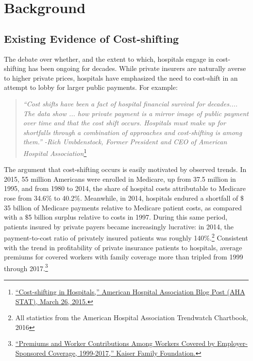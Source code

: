\documentclass[12pt]{article}
\begin{document}
\section{Background}
\label{sec:Background}

\subsection{Existing Evidence of Cost-shifting}
The debate over whether, and the extent to which, hospitals engage in cost-shifting has been ongoing for decades. While private insurers are naturally averse to higher private prices, hospitals have emphasized the need to cost-shift in an attempt to lobby for larger public payments. For example:
\begin{quote}
\textit{``Cost shifts have been a fact of hospital financial survival for decades.... The data show ...  how private payment is a mirror image of public payment over time and that the cost shift occurs. Hospitals must make up for shortfalls through a combination of approaches and cost-shifting is among them.'' -Rich Umbdenstock, Former President and CEO of American Hospital Association}\footnote{\href{http://blog.aha.org/post/costshifting-in-hospitals-}{``Cost-shifting in Hospitals,'' American Hospital Association Blog Post (AHA STAT), March 26, 2015.}}
\end{quote}

The argument that cost-shifting occurs is easily motivated by observed trends.  In 2015, 55 million Americans were enrolled in Medicare, up from 37.5 million in 1995, and from 1980 to 2014, the share of hospital costs attributable to Medicare rose from 34.6$\%$ to 40.2$\%$.  Meanwhile, in 2014, hospitals endured a shortfall of $\$$35 billion of Medicare payments relative to Medicare patient costs, as compared with a $\$$5 billion surplus relative to costs in 1997.  During this same period, patients insured by private payers became increasingly lucrative: in 2014, the payment-to-cost ratio of privately insured patients was roughly 140$\%$.\footnote{All statistics from the American Hospital Association Trendwatch Chartbook, 2016} Consistent with the trend in profitability of private insurance patients to hospitals, average premiums for covered workers with family coverage more than tripled from 1999 through 2017.\footnote{\href{https://www.kff.org/interactive/premiums-and-worker-contributions/?coverageGroup=family}{``Premiums and Worker Contributions Among Workers Covered by Employer-Sponsored Coverage, 1999-2017,'' Kaiser Family Foundation.}}
\end{document}
